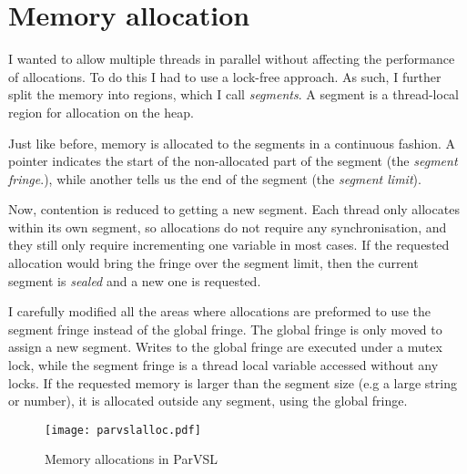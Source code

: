 

\section{Memory allocation}
\label{sec:malloc}
\label{sec:storage}

I wanted to allow multiple threads in parallel without affecting the performance
of allocations. To do this I had to use a lock-free approach. As such, I further
split the memory into regions, which I call \emph{segments}. A segment is a thread-local region
for allocation on the heap.

Just like before, memory is allocated to the segments in a continuous
fashion. A pointer indicates the start of the non-allocated part of the segment
(the \emph{segment fringe}.), while another tells us the end of the segment
(the \emph{segment limit}).

Now, contention is reduced to getting a new segment. Each thread only allocates within
its own segment, so allocations do not require any synchronisation, and they still only
require incrementing one variable in most cases. If the requested allocation would bring
the fringe over the segment limit, then the current segment is \emph{sealed} and a new one is
requested.

I carefully modified all the areas where allocations are preformed to use the segment fringe
instead of the global fringe. The global fringe is only moved to assign a new segment. Writes
to the global fringe are executed under a mutex lock, while the segment fringe is a thread local
variable accessed without any locks. If the requested memory is larger than the segment size
(e.g a large string or number), it is allocated outside any segment, using the global fringe.

\begin{figure}[H]
  \centering
  \texttt{[image: parvslalloc.pdf]}
  \label{fig:parvslalloc}
  \caption{Memory allocations in ParVSL}
\end{figure}

